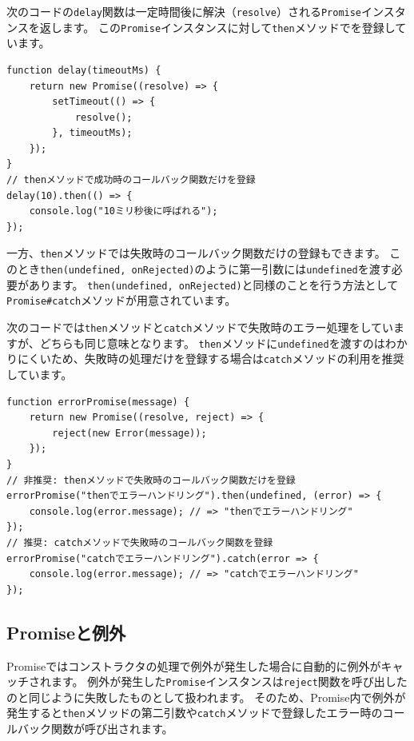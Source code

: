 次のコードの\texttt{delay}関数は一定時間後に解決（\texttt{resolve}）される\texttt{Promise}インスタンスを返します。
この\texttt{Promise}インスタンスに対して\texttt{then}メソッドで\textbf{}を登録しています。

\begin{lstlisting}
function delay(timeoutMs) {
    return new Promise((resolve) => {
        setTimeout(() => {
            resolve();
        }, timeoutMs);
    });
}
// thenメソッドで成功時のコールバック関数だけを登録
delay(10).then(() => {
    console.log("10ミリ秒後に呼ばれる");
});
\end{lstlisting}

一方、\texttt{then}メソッドでは失敗時のコールバック関数だけの登録もできます。
このとき\texttt{then(undefined, onRejected)}のように第一引数には\texttt{undefined}を渡す必要があります。
\texttt{then(undefined, onRejected)}と同様のことを行う方法として\texttt{Promise\#catch}メソッドが用意されています。

次のコードでは\texttt{then}メソッドと\texttt{catch}メソッドで失敗時のエラー処理をしていますが、どちらも同じ意味となります。
\texttt{then}メソッドに\texttt{undefined}を渡すのはわかりにくいため、失敗時の処理だけを登録する場合は\texttt{catch}メソッドの利用を推奨しています。

\begin{lstlisting}
function errorPromise(message) {
    return new Promise((resolve, reject) => {
        reject(new Error(message));
    });
}
// 非推奨: thenメソッドで失敗時のコールバック関数だけを登録
errorPromise("thenでエラーハンドリング").then(undefined, (error) => {
    console.log(error.message); // => "thenでエラーハンドリング"
});
// 推奨: catchメソッドで失敗時のコールバック関数を登録
errorPromise("catchでエラーハンドリング").catch(error => {
    console.log(error.message); // => "catchでエラーハンドリング"
});
\end{lstlisting}

\hypertarget{promsie-exception}{%
\subsection{Promiseと例外}\label{promsie-exception}}

Promiseではコンストラクタの処理で例外が発生した場合に自動的に例外がキャッチされます。
例外が発生した\texttt{Promise}インスタンスは\texttt{reject}関数を呼び出したのと同じように失敗したものとして扱われます。
そのため、Promise内で例外が発生すると\texttt{then}メソッドの第二引数や\texttt{catch}メソッドで登録したエラー時のコールバック関数が呼び出されます。

